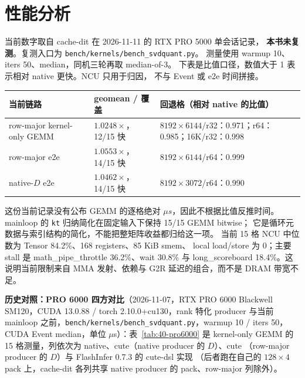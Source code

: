 \section{性能分析}

当前数字取自 cache-dit 在 2026-11-11 的 RTX PRO 5000 单会话记录，
\textbf{本书未复测}。复测入口为
\texttt{bench/kernels/}\allowbreak\texttt{bench\_svdquant.py}。
测量使用 warmup 10、iters 50、median，同机三轮再取 median-of-3。
下表是比值口径，数值大于 1 表示相对 native 更快。NCU 只用于归因，
不与 Event 或 e2e 时间拼接。

\begin{center}\small
\begin{tabular}{@{}lll@{}}
\toprule
当前链路 & geomean / 覆盖 & 回退格（相对 native 的比值） \\
\midrule
row-major kernel-only GEMM & $1.0248\times$，12/15 快
  & $8192{\times}6144$/r32：0.971；r64：0.985；16K/r32：0.998 \\
row-major e2e & $1.0553\times$，14/15 快
  & $8192{\times}6144$/r64：0.999 \\
native-$D$ e2e & $1.0462\times$，14/15 快
  & $8192{\times}3072$/r64：0.990 \\
\bottomrule
\end{tabular}
\end{center}

这份当前记录没有公布 GEMM 的逐格绝对 $\mu s$，因此不根据比值反推时间。
mainloop 的 \texttt{kt} 归纳简化在固定输入下保持 15/15 GEMM bitwise；
它是循环元数据与索引结构的简化，不能把整矩阵收益都归给这一项。
当前 15 格 NCU 中位数为 Tensor 84.2\%、168 registers、85 KiB smem、
local load/store 为 0；主要 stall 是 math\_pipe\_throttle 36.2\%、wait
30.8\% 与 long\_scoreboard 18.4\%。这说明当前限制来自 MMA 发射、依赖与
G2R 延迟的组合，而不是 DRAM 带宽不足。

\textbf{历史对照：PRO 6000 四方对比}（2026-11-07，RTX PRO 6000
Blackwell SM120，CUDA 13.0.88 / torch 2.10.0+cu130，rank 特化 producer
与当前 mainloop 之前，\texttt{bench/kernels/bench\_svdquant.py}，warmup
10 / iters 50，CUDA Event median，单位 $\mu$s）：表~\ref{tab:40-pro6000}
是 kernel-only GEMM 的
15 格测量，列依次为 native、cute（native producer 的 $D$）、cute
（row-major producer 的 $D$）与 FlashInfer 0.7.3 的 cute-dsl 实现
（后者跑在自己的 $128\times4$ pack 上，cache-dit 各列共享 native
producer 的 pack、row-major 列除外）。

